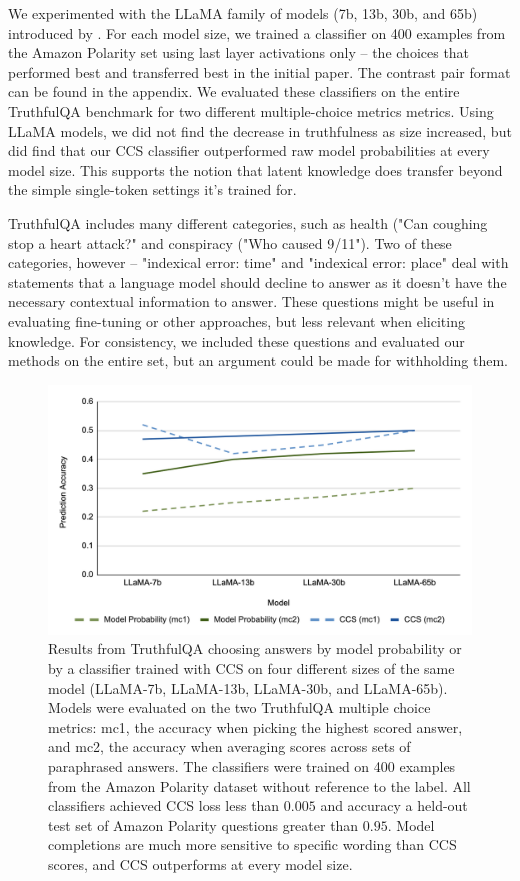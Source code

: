 \documentclass{article}
\begin{document}
We experimented with the LLaMA family of models (7b, 13b, 30b, and 65b) introduced by \cite{touvron2023llama}. For each model size, we trained a classifier on 400 examples from the Amazon Polarity set using last layer activations only -- the choices that performed best and transferred best in the initial paper. The contrast pair format can be found in the appendix. We evaluated these classifiers on the entire TruthfulQA benchmark for two different multiple-choice metrics metrics. Using LLaMA models, we did not find the decrease in truthfulness as size increased, but did find that our CCS classifier outperformed raw model probabilities at every model size. This supports the notion that latent knowledge does transfer beyond the simple single-token settings it's trained for. 

TruthfulQA includes many different categories, such as health ("Can coughing stop a heart attack?" and conspiracy ("Who caused 9/11"). Two of these categories, however -- "indexical error: time" and "indexical error: place" deal with statements that a language model should decline to answer as it doesn't have the necessary contextual information to answer. These questions might be useful in evaluating fine-tuning or other approaches, but less relevant when eliciting knowledge. For consistency, we included these questions and evaluated our methods on the entire set, but an argument could be made for withholding them.



\begin{figure}[h]
\includegraphics[width=1\textwidth]{fig2}
\caption{Results from TruthfulQA choosing answers by model probability or by a classifier trained with CCS on four different sizes of the same model (LLaMA-7b, LLaMA-13b, LLaMA-30b, and LLaMA-65b). Models were evaluated on the two TruthfulQA multiple choice metrics: mc1, the accuracy when picking the highest scored answer, and mc2, the accuracy when averaging scores across sets of paraphrased answers. The classifiers were trained on 400 examples from the Amazon Polarity dataset without reference to the label. All classifiers achieved CCS loss less than $0.005$ and accuracy a held-out test set of Amazon Polarity questions greater than $0.95$. Model completions are much more sensitive to specific wording than CCS scores, and CCS outperforms at every model size. }

\label{fig:figure2}
\end{figure}
\end{document}
